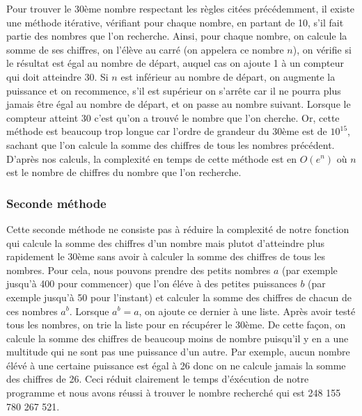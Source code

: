 \documentclass{article}
\begin{document}
Pour trouver le 30ème nombre respectant les règles citées précédemment, il existe une méthode itérative, vérifiant pour chaque nombre, en partant de 10, s'il fait partie des nombres que l'on recherche. Ainsi, pour chaque nombre, on calcule la somme de ses chiffres, on l'élève au carré (on appelera ce nombre $n$), on vérifie si le résultat est égal au nombre de départ, auquel cas on ajoute 1 à un compteur qui doit atteindre 30. Si $n$ est inférieur au nombre de départ, on augmente la puissance et on recommence, s'il est supérieur on s'arrête car il ne pourra plus jamais être égal au nombre de départ, et on passe au nombre suivant. Lorsque le compteur atteint 30 c'est qu'on a trouvé le nombre que l'on cherche. Or, cette méthode est beaucoup trop longue car l'ordre de grandeur du 30ème est de $10^{15}$, sachant que l'on calcule la somme des chiffres de tous les nombres précédent. D'après nos calculs, la complexité en temps de cette méthode est en $O(e^{n})$  où $n$ est le nombre de chiffres du nombre que l'on recherche.


\subsubsection{Seconde méthode}

Cette seconde méthode ne consiste pas à réduire la complexité de notre fonction qui calcule la somme des chiffres d'un nombre mais plutot d'atteindre plus rapidement le 30ème sans avoir à calculer la somme des chiffres de tous les nombres. Pour cela, nous pouvons prendre des petits nombres $a$ (par exemple jusqu'à 400 pour commencer) que l'on éléve à des petites puissances $b$ (par exemple jusqu'à 50 pour l'instant) et calculer la somme des chiffres de chacun de ces nombres $a^{b}$. Lorsque $a^{b} = a$, on ajoute ce dernier à une liste. Après avoir testé tous les nombres, on trie la liste pour en récupérer le 30ème. De cette façon, on calcule la somme des chiffres de beaucoup moins de nombre puisqu'il y en a une multitude qui ne sont pas une puissance d'un autre. Par exemple, aucun nombre élévé à une certaine puissance est égal à 26 donc on ne calcule jamais la somme des chiffres de 26. Ceci réduit clairement le temps d'éxécution de notre programme et nous avons réussi à trouver le nombre recherché qui est 248 155 780 267 521.
\end{document}
